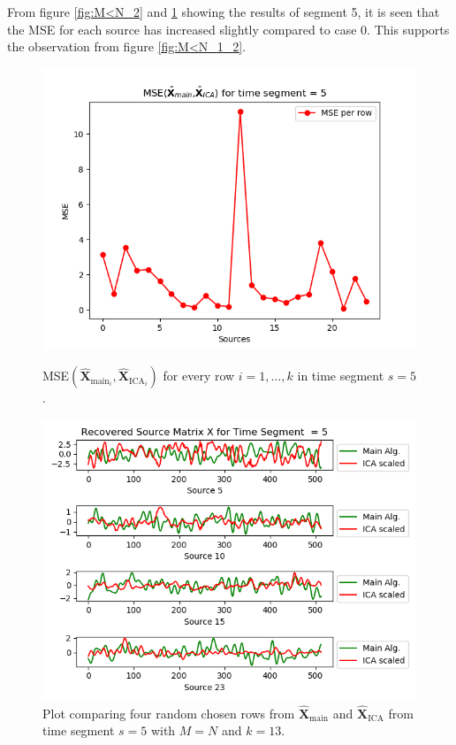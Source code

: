 \noindent 
From figure \ref{fig:M<N_2} and \ref{fig:M<N_3} showing the results of segment 5, it is seen that the MSE for each source has increased slightly compared to case 0. 
This supports the observation from figure \ref{fig:M<N_1_2}.      
\begin{figure}[H]
\begin{widepage}
    \begin{minipage}[t]{.45\textwidth}
\centering
\includegraphics[width=1\linewidth]{figures/ch_7/resultat/mse_third_removed_ica_timeseg5.png}
\caption{MSE$\left(\hat{\mathbf{X}}_{\text{main}_{i}},\hat{\mathbf{X}}_{\text{ICA}_{i}}\right)$ for every row $i = 1, \dots, k$ in time segment $s=5$.}
\label{fig:M<N_2}
\end{minipage} 
\hspace{0.5cm}
\begin{minipage}[t]{.45\textwidth}
\centering
\includegraphics[width=1\linewidth]{figures/ch_7/resultat/EEG_third_removed_scaled_timeseg5S1_CClean.png}
\caption{Plot comparing four random chosen rows from $\hat{\mathbf{X}}_{\text{main}}$ and $\hat{\mathbf{X}}_{\text{ICA}}$ from time segment $s = 5$ with $M = N$ and $k=13$.}
	\label{fig:M<N_3}
    \end{minipage}
\end{widepage}
\end{figure}
